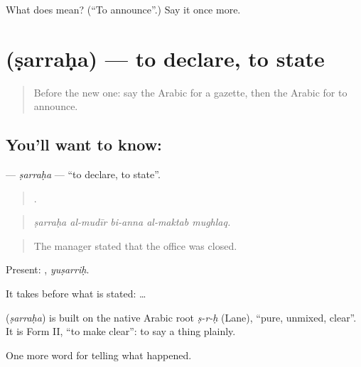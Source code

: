 \begin{tcolorbox}[breakable,colback=teal!4,colframe=teal!35!black,title={Before you move on}]
What does  mean? (\textquotedblleft{}To announce\textquotedblright{}.) Say it once more.
\end{tcolorbox}
\section[\texorpdfstring{\ar{صرح} (ṣarraḥa)}{صرح (ṣarraḥa)}]{ (ṣarraḥa) — to declare, to state}

\label{lesson:AR-C293-sarraha}



\begin{quote}
Before the new one: say the Arabic for a gazette, then the Arabic for to announce.
\end{quote}

\subsection*{You'll want to know: }
\textbf{} — \emph{ṣarraḥa} — \textquotedblleft{}to declare, to state\textquotedblright{}.

\begin{quote}
    .
\end{quote}

\begin{quote}
\emph{ṣarraḥa al-mudīr bi-anna al-maktab mughlaq.}
\end{quote}

\begin{quote}
The manager stated that the office was closed.
\end{quote}

Present: , \emph{yuṣarriḥ}.

It takes  before what is stated:   …

\begin{cousinweb}
\textbf{} (\emph{ṣarraḥa}) is built on the native Arabic root \emph{ṣ-r-ḥ} (Lane), \textquotedblleft{}pure, unmixed, clear\textquotedblright{}. It is Form II, \textquotedblleft{}to make clear\textquotedblright{}: to say a thing plainly.
\end{cousinweb}

\begin{grammarlens}[title={What you've built}]
One more word for telling what happened.
\end{grammarlens}

